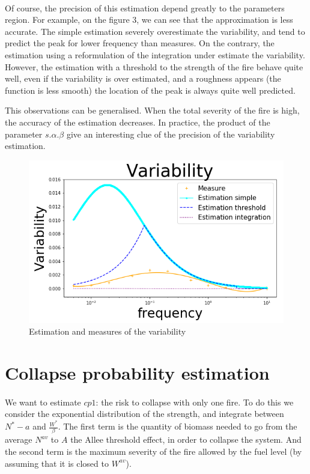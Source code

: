 \documentclass{article}
\begin{document}
\newpage
\paragraph{}
Of course, the precision of this estimation depend greatly to the parameters region. For example, on the figure 3, we can see that the approximation is less accurate. The simple estimation severely overestimate the variability, and tend to predict the peak for lower frequency than measures. On the contrary, the estimation using a reformulation of the integration under estimate the variability. However, the estimation with a threshold to the strength of the fire behave quite well, even if the variability is over estimated, and a roughness appears (the function is less smooth) the location of the peak is always quite well predicted.

This observations can be generalised. When the total severity of the fire is high, the accuracy of the estimation decreases. In practice, the product of the parameter $s.\alpha.\beta$ give an interesting clue of the precision of the variability estimation.

\begin{figure}[h!]
\centering
\includegraphics[width=12cm]{variability_2.png}
\caption{Estimation and measures of the variability}
\end{figure}


\newpage
\section{Collapse probability estimation}
\label{cp_derivation}

\paragraph{}
We want to estimate $cp1$: the risk to collapse with only one fire. To do this we consider the exponential distribution of the strength, and integrate between $N^*-a$ and $\frac{W^*}{\beta}$. The first term is the quantity of biomass needed to go from the average $N^{av}$ to $A$ the Allee threshold effect, in order to collapse the system. And the second term is the maximum severity of the fire allowed by the fuel level (by assuming that it is closed to $W^{av}$).
\end{document}
